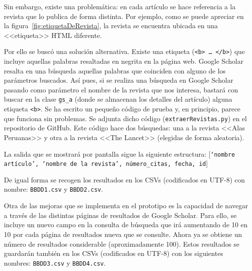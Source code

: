 
Sin embargo, existe una problemática: en cada artículo se hace referencia a la revista que lo publica de forma distinta. Por ejemplo, como se puede apreciar en la figura~\ref{fig:etiquetaDeRevista}, la revista se encuentra ubicada en una <<etiqueta>> HTML diferente.


Por ello se buscó una solución alternativa.
Existe una etiqueta (\texttt{<b> … </b>}) que incluye aquellas palabras resaltadas en negrita en la página web. Google Scholar resalta en una búsqueda aquellas palabras que coinciden con alguno de los parámetros buscados. Así pues, si se realiza una búsqueda en Google Scholar pasando como parámetro el nombre de la revista que nos interesa, bastará con buscar en la clase  \texttt{gs\_a} (donde se almacenan los detalles del artículo) alguna etiqueta \texttt{<b>}.
Se ha escrito un pequeño código de prueba y, en principio, parece que funciona sin problemas. Se adjunta dicho código (\texttt{extraerRevistas.py}) en el repositorio de GitHub. %
Este código hace dos búsquedas: una a la revista <<Alas Peruanas>> y otra a la revista <<The Lancet>> (elegidas de forma aleatoria).



La salida que se mostrará por pantalla sigue la siguiente estructura: [\texttt{‘nombre artículo’, ‘nombre de la revista’, número\_citas, fecha, id}]

De igual forma se recogen los resultados en los CSVs (codificados en UTF-8) con nombre: \texttt{BBDD1.csv} y \texttt{BBDD2.csv}.



Otra de las mejoras que se implementa en el prototipo es la capacidad de navegar a través de las distintas páginas de resultados de Google Scholar. Para ello, se incluye un nuevo campo en la consulta de búsqueda que irá aumentando de 10 en 10 por cada página de resultados nueva que se consulte.
Ahora ya se obtiene un número de resultados considerable (aproximadamente 100). Estos resultados se guardarán también en los CSVs (codificados en UTF-8) con los siguientes nombres: \texttt{BBDD3.csv} y \texttt{BBDD4.csv}.

